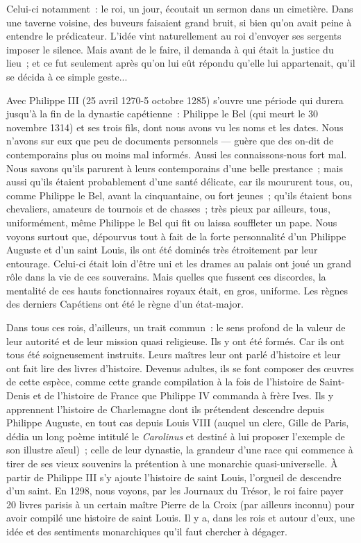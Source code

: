\documentclass[french,twoside]{book} %
\begin{document}
\noindent Celui-ci notamment : le roi, un jour, écoutait un sermon dans un cimetière. Dans une taverne voisine, des buveurs faisaient grand bruit, si bien qu’on avait peine à  
\label{p16} entendre le prédicateur. L’idée vint naturellement au roi d’envoyer ses sergents imposer le silence. Mais avant de le faire, il demanda à qui était la justice du lieu ; et ce fut seulement après qu’on lui eût répondu qu’elle lui appartenait, qu’il se décida à ce simple geste...\par
Avec Philippe III (25 avril 1270-5 octobre 1285) s’ouvre une période qui durera jusqu’à la fin de la dynastie capétienne : Philippe le Bel (qui meurt le 30 novembre 1314) et ses trois fils, dont nous avons vu les noms et les dates. Nous n’avons sur eux que peu de documents personnels — guère que des on-dit de contemporains plus ou moins mal informés. Aussi les connaissons-nous fort mal. Nous savons qu’ils parurent à leurs contemporains d’une belle prestance ; mais aussi qu’ils étaient probablement d’une santé délicate, car ils moururent tous, ou, comme Philippe le Bel, avant la cinquantaine, ou fort jeunes ; qu’ils étaient bons chevaliers, amateurs de tournois et de chasses ; très pieux par ailleurs, tous, uniformément, même Philippe le Bel qui fit ou laissa souffleter un pape. Nous voyons surtout que, dépourvus tout à fait de la forte personnalité d’un Philippe Auguste et d’un saint Louis, ils ont été dominés très étroitement par leur entourage. Celui-ci était loin d’être uni et les drames au palais ont joué un grand rôle dans la vie de ces souverains. Mais quelles que fussent ces discordes, la mentalité de ces hauts fonctionnaires royaux était, en gros, uniforme. Les règnes des derniers Capétiens ont été le règne d’un état-major.\par
Dans tous ces rois, d’ailleurs, un trait commun : le sens profond de la valeur de leur autorité et de leur mission quasi religieuse. Ils y ont été formés. Car ils ont tous été soigneusement instruits. Leurs maîtres leur ont parlé d’histoire et leur ont fait lire des livres d’histoire. Devenus adultes, ils se font composer des œuvres de cette espèce, comme cette grande compilation à la fois de l’histoire de Saint-Denis et de l’histoire de France que Philippe IV commanda à frère Ives. Ils y apprennent l’histoire de Charlemagne dont ils prétendent descendre depuis Philippe Auguste, en tout cas depuis Louis VIII (auquel un clerc, Gille de Paris, dédia un long poème intitulé le {\itshape Carolinus} et destiné à lui proposer l’exemple de son illustre aïeul) ; celle de leur dynastie, la grandeur d’une race qui commence à tirer de ses vieux souvenirs la prétention à une monarchie quasi-universelle. À partir de Philippe III s’y ajoute l’histoire de saint Louis, l’orgueil de descendre d’un saint. En 1298, nous voyons, par les Journaux du Trésor, le roi faire payer 20 livres parisis à un certain maître Pierre de la Croix (par ailleurs inconnu) pour avoir compilé une histoire de saint Louis. Il y a, dans les rois et autour d’eux, une idée et des sentiments monarchiques qu’il faut chercher à dégager.
\end{document}
